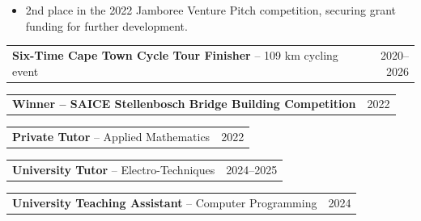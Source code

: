 \documentclass[10pt,a4paper]{article}
\begin{document}
    \vspace{-0.3em}
    \begin{itemize}[leftmargin=2.2em, itemsep=0pt, topsep=0.15em]
      \item 2nd place in the 2022 Jamboree Venture Pitch competition, securing grant funding for further development.
    \end{itemize}
    \vspace{-0.2em}


    \noindent\begin{tabularx}{\linewidth}{>{\raggedright\arraybackslash}X r}
      \textbf{Six-Time Cape Town Cycle Tour Finisher} -- 109 km cycling event & 2020--2026 \\
    \end{tabularx}

    \noindent\begin{tabularx}{\linewidth}{>{\raggedright\arraybackslash}X r}
      \textbf{Winner -- SAICE Stellenbosch Bridge Building Competition} & 2022 \\
    \end{tabularx}

    \noindent\begin{tabularx}{\linewidth}{>{\raggedright\arraybackslash}X r}
      \textbf{Private Tutor} -- Applied Mathematics & 2022 \\
    \end{tabularx}

    \noindent\begin{tabularx}{\linewidth}{>{\raggedright\arraybackslash}X r}
      \textbf{University Tutor} -- Electro-Techniques & 2024--2025 \\
    \end{tabularx}

    \noindent\begin{tabularx}{\linewidth}{>{\raggedright\arraybackslash}X r}
      \textbf{University Teaching Assistant} -- Computer Programming & 2024 \\
    \end{tabularx}
\end{document}
